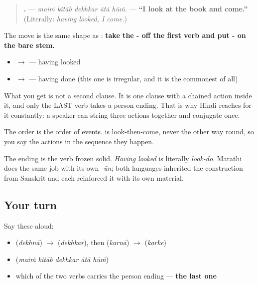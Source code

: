 \begin{grammarlens}[title={Grammar Lens: put -\hi{कर} on the stem and the clause disappears}]
\begin{quote}
\textbf{    .} — \emph{maiṁ kitāb dekhkar ātā hūṁ.} — \textbf{\textquotedblleft{}I look at the book and come.\textquotedblright{}} (Literally: \emph{having looked, I come.})
\end{quote}

The move is the same shape as \textbf{}: \textbf{take the - off the first verb and put - on the bare stem.}

\begin{itemize}
\raggedright
  \item \textbf{} $\to$ \textbf{} — having looked
  \item \textbf{} $\to$ \textbf{} — having done (this one is irregular, and it is the commonest of all)
\end{itemize}

What you get is not a second clause. It is one clause with a chained action inside it, and only the LAST verb takes a person ending. That is why Hindi reaches for it constantly: a speaker can string three actions together and conjugate once.

The order is the order of events. \textbf{  } is look-then-come, never the other way round, so you say the actions in the sequence they happen.

The ending is the verb \textbf{} frozen solid. \emph{Having looked} is literally \emph{look-do}. Marathi does the same job with its own \emph{-ūn}; both languages inherited the construction from Sanskrit and each reinforced it with its own material.
\end{grammarlens}

\subsection*{Your turn}
Say these aloud:

\begin{itemize}
\raggedright
  \item \textbf{} (\emph{dekhnā}) $\to$ \textbf{} (\emph{dekhkar}), then \textbf{} (\emph{karnā}) $\to$ \textbf{} (\emph{karke})
  \item \textbf{    } (\emph{maiṁ kitāb dekhkar ātā hūṁ})
  \item which of the two verbs carries the person ending — \textbf{the last one}
\end{itemize}

